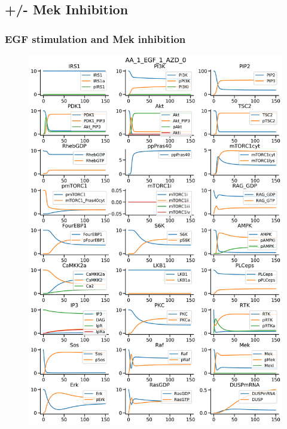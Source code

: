 \documentclass{beamer}
\begin{document}
\subsection{+/- Mek Inhibition}
\begin{frame}
\frametitle{EGF stimulation and Mek inhibition}
\begin{figure}
    \begin{minipage}{0.45\textwidth}
        \centering
        \includegraphics[width=\textwidth]{../simulations/ExtendedPI3KModel/validations/AAWithEGFWithAZD/AA_1_EGF_1_AZD_0-6.png}
    \end{minipage}
    \begin{minipage}{0.45\textwidth}
        \centering

\end{minipage}
\end{figure}
\end{frame}
\end{document}

